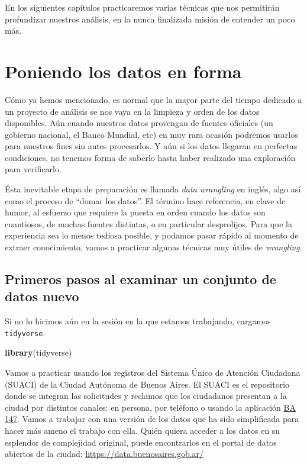 \documentclass[]{book}
\newenvironment{Shaded}{\begin{snugshade}}{\end{snugshade}}
\newcommand{\KeywordTok}[1]{\textcolor[rgb]{0.13,0.29,0.53}{\textbf{#1}}}
\newcommand{\NormalTok}[1]{#1}
\begin{document}
En los siguientes capítulos practicaremos varias técnicas que nos
permitirán profundizar nuestros análisis, en la nunca finalizada misión
de entender un poco más.

\chapter{Poniendo los datos en forma}\label{poniendo-los-datos-en-forma}

Cómo ya hemos mencionado, es normal que la mayor parte del tiempo
dedicado a un proyecto de análisis se nos vaya en la limpieza y orden de
los datos disponibles. Aún cuando nuestros datos provengan de fuentes
oficiales (un gobierno nacional, el Banco Mundial, etc) en muy rara
ocasión podremos usarlos para nuestros fines sin antes procesarlos. Y
aún si los datos llegaran en perfectas condiciones, no tenemos forma de
saberlo hasta haber realizado una exploración para verificarlo.

Ésta inevitable etapa de preparación es llamada \emph{data wrangling} en
inglés, algo así como el proceso de ``domar los datos''. El término hace
referencia, en clave de humor, al esfuerzo que requiere la puesta en
orden cuando los datos son cuantiosos, de muchas fuentes distintas, o en
particular desprolijos. Para que la experiencia sea lo menos tediosa
posible, y podamos pasar rápido al momento de extraer conocimiento,
vamos a practicar algunas técnicas muy útiles de \emph{wrangling}.

\section{Primeros pasos al examinar un conjunto de datos
nuevo}\label{primeros-pasos-al-examinar-un-conjunto-de-datos-nuevo}

Si no lo hicimos aún en la sesión en la que estamos trabajando, cargamos
\texttt{tidyverse}.

\begin{Shaded}
\begin{Highlighting}[]
\KeywordTok{library}\NormalTok{(tidyverse)}
\end{Highlighting}
\end{Shaded}

Vamos a practicar usando los registros del Sistema Único de Atención
Ciudadana (SUACI) de la Ciudad Autónoma de Buenos Aires. El SUACI es el
repositorio donde se integran las solicitudes y reclamos que los
ciudadanos presentan a la ciudad por distintos canales: en persona, por
teléfono o usando la aplicación
\href{https://gestioncolaborativa.buenosaires.gob.ar/prestaciones}{BA
147}. Vamos a trabajar con una versión de los datos que ha sido
simplificada para hacer más ameno el trabajo con ella. Quién quiera
acceder a los datos en su esplendor de complejidad original, puede
encontrarlos en el portal de datos abiertos de la ciudad:
\url{https://data.buenosaires.gob.ar/}
\end{document}
